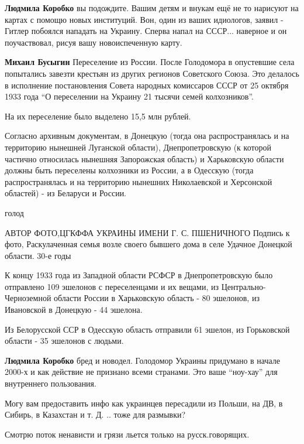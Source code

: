 \begin{itemize}
{\begin{itemize}
\textbf{Людмила Коробко} вы подождите. Вашим детям и внукам ещё не то нарисуют
на картах с помощю новых институций. Вон, один из ваших идиологов, заявил - 
Гитлер побоялся нападать на Украину. Сперва напал на СССР... наверное и он
поучаствовал, рисуя вашу новоиспеченную карту.

\textbf{Михаил Бусыгин} Переселение из России.
После Голодомора в опустевшие села попытались завезти крестьян из других
регионов Советского Союза. Это делалось в исполнение постановления Совета
народных комиссаров СССР от 25 октября 1933 года \enquote{О переселении на Украину 21
тысячи семей колхозников}.

На их переселение было выделено 15,5 млн рублей.

Согласно архивным документам, в Донецкую (тогда она распространялась и на
территорию нынешней Луганской области), Днепропетровскую (к которой частично
относилась нынешняя Запорожская область) и Харьковскую области должны быть
переселены колхозники из России, а в Одесскую (тогда распространялась и на
территорию нынешних Николаевской и Херсонской областей) - из Беларуси и России.

голод

АВТОР ФОТО,ЦГКФФА УКРАИНЫ ИМЕНИ Г. С. ПШЕНИЧНОГО
Подпись к фото,
Раскулаченная семья возле своего бывшего дома в селе Удачное Донецкой области. 30-е годы

К концу 1933 года из Западной области РСФСР в Днепропетровскую было отправлено
109 эшелонов с переселенцами и их вещами, из Центрально-Черноземной области
России в Харьковскую область - 80 эшелонов, из Ивановской в Донецкую - 44
эшелона.

Из Белорусской ССР в Одесскую область отправили 61 эшелон, из Горьковской
области - 35 эшелонов с людьми.


\textbf{Людмила Коробко} бред и новодел. Голодомор Украины придумано в начале
2000-х и как действие не признано всеми странами. Это ваше \enquote{ноу-хау} для
внутреннего пользования.

Могу вам предоставить инфо как украинцев пересадили из Польши, на ДВ, в Сибирь,
в Казахстан и т. Д. .. тоже для размывки?

\end{itemize}

Смотрю поток ненависти и грязи льется только на русск.говорящих.

\begin{itemize}


\end{itemize}}
\end{itemize}
